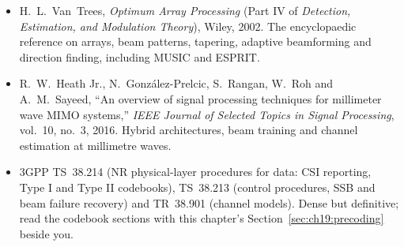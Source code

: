 \begin{itemize}
Press, 2018. An engineering-oriented graduate text covering precoding, limited feedback, MU-MIMO
and massive MIMO with care.
\item H.~L.~Van~Trees, \emph{Optimum Array Processing} (Part IV of \emph{Detection, Estimation, and
Modulation Theory}), Wiley, 2002. The encyclopaedic reference on arrays, beam patterns, tapering,
adaptive beamforming and direction finding, including MUSIC and ESPRIT.
\item R.~W.~Heath Jr., N.~Gonz\'alez-Prelcic, S.~Rangan, W.~Roh and A.~M.~Sayeed, ``An overview of
signal processing techniques for millimeter wave MIMO systems,'' \emph{IEEE Journal of Selected Topics
in Signal Processing}, vol.~10, no.~3, 2016. Hybrid architectures, beam training and channel
estimation at millimetre waves.
\item 3GPP TS~38.214 (NR physical-layer procedures for data: CSI reporting, Type I and Type II
codebooks), TS~38.213 (control procedures, SSB and beam failure recovery) and TR~38.901 (channel
models). Dense but definitive; read the codebook sections with this chapter's
Section~\ref{sec:ch19:precoding} beside you.
\end{itemize}
